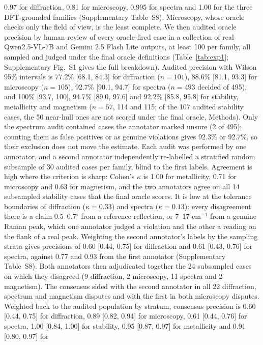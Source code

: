 \documentclass[pdflatex,sn-nature]{sn-jnl}
\begin{document}
{{0.97 for diffraction, 0.81 for microscopy, 0.995 for spectra and 1.00 for the three DFT-grounded families
(Supplementary Table~S8). Microscopy, whose oracle checks only the field of view, is the least complete. We then audited oracle precision by human review of every oracle-fired
case in a collection of real Qwen2.5-VL-7B and Gemini 2.5 Flash Lite outputs, at least 100 per
family, all sampled and judged under the final oracle definitions (Table~\ref{tab:exp1};
Supplementary Fig.~S1 gives the full breakdown). Audited precision with Wilson 95\% intervals is 77.2\% [68.1, 84.3] for diffraction
($n=101$), 88.6\% [81.1, 93.3] for microscopy ($n=105$), 92.7\% [90.1, 94.7] for spectra
($n=493$ decided of 495), and 100\% [93.7, 100], 94.7\% [89.0, 97.6] and 92.2\% [85.8, 95.8]
for stability, metallicity and magnetism ($n=57$, 114 and 115; of the 107 audited stability cases,
the 50 near-hull ones are not scored under the final oracle, Methods). Only the spectrum audit
contained cases the annotator marked unsure (2 of 495); counting them as false positives or as
genuine violations gives 92.3\% or 92.7\%, so their exclusion does not move the estimate. Each
audit was performed by one annotator, and a second annotator independently re-labelled a stratified
random subsample of 30 audited cases per family, blind to the first labels. Agreement is high where the
criterion is sharp: Cohen's $\kappa$ is 1.00 for metallicity, 0.71 for microscopy and 0.63 for
magnetism, and the two annotators agree on all 14 subsampled stability cases that the final oracle
scores. It is low at the tolerance boundaries of diffraction ($\kappa=0.33$) and spectra ($\kappa=0.13$):
every disagreement there is a claim 0.5--0.7$^\circ$ from a reference reflection, or 7--17
$\mathrm{cm}^{-1}$ from a genuine Raman peak, which one annotator judged a violation and the other a
reading on the flank of a real peak. Weighting the second annotator's labels by the sampling strata
gives precisions of 0.60 [0.44, 0.75] for diffraction and 0.61 [0.43, 0.76] for spectra, against 0.77 and
0.93 from the first annotator (Supplementary Table~S8). Both annotators then adjudicated together the
24 subsampled cases on which they disagreed (9 diffraction, 2 microscopy, 11 spectra and 2 magnetism).
The consensus sided with the second annotator in all 22 diffraction, spectrum and magnetism disputes and
with the first in both microscopy disputes. Weighted back to the audited population by stratum, consensus
precision is 0.60 [0.44, 0.75] for diffraction, 0.89 [0.82, 0.94] for microscopy, 0.61 [0.44, 0.76] for
spectra, 1.00 [0.84, 1.00] for stability, 0.95 [0.87, 0.97] for metallicity and 0.91 [0.80, 0.97] for
}}
\end{document}
